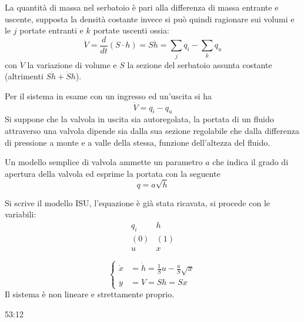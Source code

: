 La quantità di massa nel serbatoio è pari alla differenza di massa entrante e
uscente, supposta la densità costante invece si può quindi ragionare sui volumi
e le $j$ portate entranti e $k$ portate uscenti ossia:
$$
\dot{V} = \frac{d}{dt}(S\cdot h) = S\dot{h} = \sum_j q_i - \sum_k q_u
$$
con $\dot{V}$ la variazione di volume e $S$ la sezione del serbatoio
assunta costante (altrimenti $S\dot h + \dot{S}h$).

Per il sistema in esame con un ingresso ed un'uscita si ha
$$
\dot{V} = q_i - q_u
$$
Si suppone che la valvola in uscita sia autoregolata, la portata di un fluido
attraverso una valvola dipende sia dalla sua sezione regolabile che dalla
differenza di pressione a monte e a valle della stessa, funzione dell'altezza
del fluido.

Un modello semplice di valvola ammette un parametro $a$ che
indica il grado di apertura della valvola ed esprime la portata con la
seguente
$$
q = a\sqrt{h}
$$

Si scrive il modello ISU, l'equazione è già stata ricavata, si procede con le
variabili:
$$
\begin{matrix}
q_i & h \\
(0) & (1) \\
u & x
\end{matrix}
$$

$$\left\{\begin{aligned}
\dot{x} &= \dot{h} = \frac{1}{S} u - \frac{a}{S}\sqrt{x} \\
y &= V = Sh = Sx
\end{aligned}\right.$$
Il sistema è non lineare e strettamente proprio.

53:12
